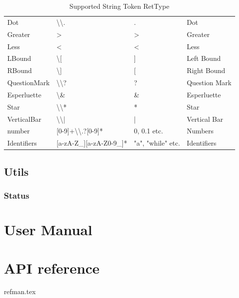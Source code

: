 \documentclass{report}
\newcommand{\+}{}
\begin{document}
\begin{table}[hb!]
\begin{tabular}{l|lll}
            Dot          & \textbackslash{}\textbackslash{}.                      & .                 & Dot            \\
            Greater      & \textgreater{}                                         & \textgreater{}    & Greater        \\
            Less         & \textless{}                                            & \textless{}       & Less           \\
            LBound       & \textbackslash{}[                                      & {]}               & Left Bound     \\
            RBound       & \textbackslash{}]                                      & {[}               & Right Bound    \\
            QuestionMark & \textbackslash{}\textbackslash{}?                      & ?                 & Question Mark  \\
            Esperluette  & \textbackslash{}\&                                     & \&                & Esperluette    \\
            Star         & \textbackslash{}\textbackslash{}*                      & *                 & Star           \\
            VerticalBar  & \textbackslash{}\textbackslash{}|                      & |                 & Vertical Bar   \\
            number       & {[}0-9{]}+\textbackslash{}\textbackslash{}.?{[}0-9{]}* & 0, 0.1 etc.       & Numbers        \\
            Identifiers  & {[}a-zA-Z\_{]}{[}a-zA-Z0-9\_{]}*                       & "a", "while" etc. & Identifiers    \\ \hline
        \end{tabular}
        \caption{Supported String Token RetType}
        \label{tab:supported_lexical_token_list}
    \end{table}

    \subsection{Utils}\label{subsec:utils}

    \subsubsection{Status }


    \section{User Manual}\label{sec:user-manual}

    \appendix


    \section{API reference }
    {refman.tex}

    \printindex
\end{document}
